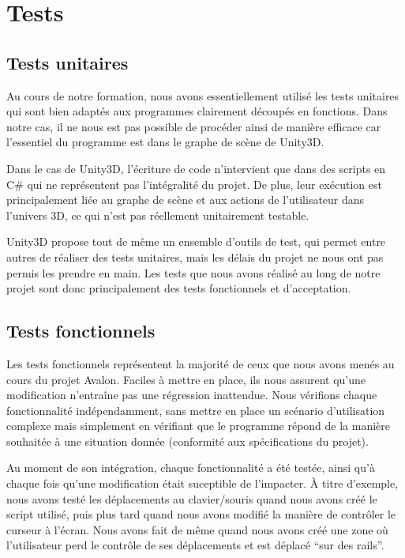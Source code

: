 \section{Tests}

\subsection{Tests unitaires}
Au cours de notre formation, nous avons essentiellement utilisé les tests unitaires qui sont bien adaptés aux programmes clairement découpés en fonctions.
Dans notre cas, il ne nous est pas possible de procéder ainsi de manière efficace car l'essentiel du programme est dans le graphe de scène de Unity3D. \newline

Dans le cas de Unity3D, l'écriture de code n'intervient que dans des scripts en C\# qui ne représentent pas l'intégralité du projet. De plus, leur exécution est principalement liée au graphe de scène et aux actions de l'utilisateur dans l'univers 3D, ce qui n'est pas réellement unitairement testable.\newline

Unity3D propose tout de même un ensemble d'outils de test, qui permet entre autres de réaliser des tests unitaires, mais les délais du projet ne nous ont pas permis les prendre en main. Les tests que nous avons réalisé au long de notre projet sont donc principalement des tests fonctionnels et d'acceptation. 

\subsection{Tests fonctionnels}
Les tests fonctionnels représentent la majorité de ceux que nous avons menés au cours du projet Avalon. Faciles à mettre en place, ils nous assurent qu'une modification n'entraîne pas une régression inattendue. Nous vérifions chaque fonctionnalité indépendamment, sans mettre en place un scénario d'utilisation complexe mais simplement en vérifiant que le programme répond de la manière souhaitée à une situation donnée (conformité aux spécifications du projet).\newline

Au moment de son intégration, chaque fonctionnalité a été testée, ainsi qu'à chaque fois qu'une modification était suceptible de l'impacter. À titre d'exemple, nous avons testé les déplacements au clavier/souris quand nous avons créé le script utilisé, puis plus tard quand nous avons modifié la manière de contrôler le curseur à l'écran. Nous avons fait de même quand nous avons créé une zone où l'utilisateur perd le contrôle de ses déplacements et est déplacé \enquote{sur des rails}.\newline

